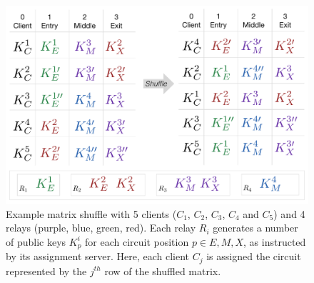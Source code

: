 \begin{figure}[t]
  \centering
    \includegraphics[scale=.6]{shuffle_total.pdf}
  \caption{
    Example matrix shuffle with 5 clients ($C_1$, $C_2$, $C_3$, $C_4$ and $C_5$) 
    and 4 relays (purple, blue, green, red). Each relay $R_i$ generates a number 
    of public keys $K_p^i$ for each circuit position $p \in {E, M, X}$, as 
    instructed by its assignment server. Here, each client $C_j$ is assigned the 
    circuit represented by the $j^{th}$ row of the shuffled matrix. 
  }
  \label{figure:shuffle}
\end{figure}
